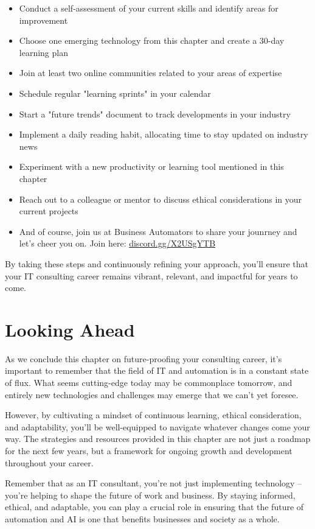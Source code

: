 \begin{itemize}
    \item Conduct a self-assessment of your current skills and identify areas for improvement
    \item Choose one emerging technology from this chapter and create a 30-day learning plan
    \item Join at least two online communities related to your areas of expertise
    \item Schedule regular "learning sprints" in your calendar
    \item Start a "future trends" document to track developments in your industry
    \item Implement a daily reading habit, allocating time to stay updated on industry news
    \item Experiment with a new productivity or learning tool mentioned in this chapter
    \item Reach out to a colleague or mentor to discuss ethical considerations in your current projects
    \item And of course, join us at Business Automators to share your jounrney and let's cheer you on. Join here: \href{https://discord.gg/X2USgYTB}{discord.gg/X2USgYTB}
\end{itemize}

By taking these steps and continuously refining your approach, you'll ensure that your IT consulting career remains vibrant, relevant, and impactful for years to come.

\section{Looking Ahead}

As we conclude this chapter on future-proofing your consulting career, it's important to remember that the field of IT and automation is in a constant state of flux. What seems cutting-edge today may be commonplace tomorrow, and entirely new technologies and challenges may emerge that we can't yet foresee.

However, by cultivating a mindset of continuous learning, ethical consideration, and adaptability, you'll be well-equipped to navigate whatever changes come your way. The strategies and resources provided in this chapter are not just a roadmap for the next few years, but a framework for ongoing growth and development throughout your career.

Remember that as an IT consultant, you're not just implementing technology – you're helping to shape the future of work and business. By staying informed, ethical, and adaptable, you can play a crucial role in ensuring that the future of automation and AI is one that benefits businesses and society as a whole.

